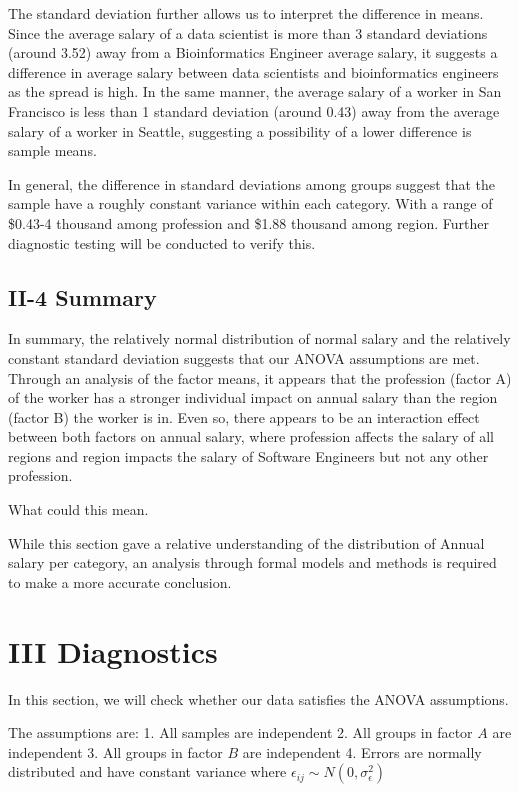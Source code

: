 \documentclass[
]{article}
\begin{document}
The standard deviation further allows us to interpret the difference in
means. Since the average salary of a data scientist is more than 3
standard deviations (around 3.52) away from a Bioinformatics Engineer
average salary, it suggests a difference in average salary between data
scientists and bioinformatics engineers as the spread is high. In the
same manner, the average salary of a worker in San Francisco is less
than 1 standard deviation (around 0.43) away from the average salary of
a worker in Seattle, suggesting a possibility of a lower difference is
sample means.

In general, the difference in standard deviations among groups suggest
that the sample have a roughly constant variance within each category.
With a range of \$0.43-4 thousand among profession and \$1.88 thousand
among region. Further diagnostic testing will be conducted to verify
this.

\subsection{II-4 Summary}\label{ii-4-summary}

In summary, the relatively normal distribution of normal salary and the
relatively constant standard deviation suggests that our ANOVA
assumptions are met. Through an analysis of the factor means, it appears
that the profession (factor A) of the worker has a stronger individual
impact on annual salary than the region (factor B) the worker is in.
Even so, there appears to be an interaction effect between both factors
on annual salary, where profession affects the salary of all regions and
region impacts the salary of Software Engineers but not any other
profession.

What could this mean.

While this section gave a relative understanding of the distribution of
Annual salary per category, an analysis through formal models and
methods is required to make a more accurate conclusion.

\section{III Diagnostics}\label{iii-diagnostics}

In this section, we will check whether our data satisfies the ANOVA
assumptions.

The assumptions are: 1. All samples are independent 2. All groups in
factor \(A\) are independent 3. All groups in factor \(B\) are
independent 4. Errors are normally distributed and have constant
variance where \(\epsilon_{ij} \sim N(0, \sigma_\epsilon^2)\)
\end{document}
